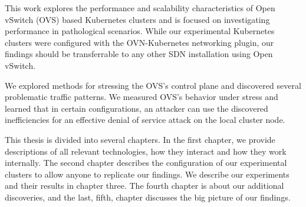 This work explores the performance and scalability characteristics of Open vSwitch (OVS) based Kubernetes clusters and is focused on investigating performance in pathological scenarios. While our experimental Kubernetes clusters were configured with the OVN-Kubernetes networking plugin, our findings should be transferrable to any other SDN installation using Open vSwitch.

We explored methods for stressing the OVS's control plane and discovered several problematic traffic patterns. We measured OVS's behavior under stress and learned that in certain configurations, an attacker can use the discovered inefficiencies for an effective denial of service attack on the local cluster node.

This thesis is divided into several chapters. In the first chapter, we provide descriptions of all relevant technologies, how they interact and how they work internally. The second chapter describes the configuration of our experimental clusters to allow anyone to replicate our findings. We describe our experiments and their results in chapter three. The fourth chapter is about our additional discoveries, and the last, fifth, chapter discusses the big picture of our findings. 



%
